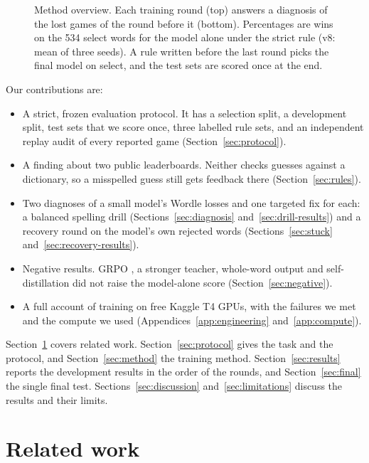 \documentclass{article}
\begin{document}
\begin{figure}[htbp]
\centering
\resizebox{\linewidth}{!}{}
\caption{Method overview. Each training round (top) answers a diagnosis of the lost games of the round before it (bottom). Percentages are wins on the 534 select words for the model alone under the strict rule (v8: mean of three seeds). A rule written before the last round picks the final model on select, and the test sets are scored once at the end.}
\label{fig:overview}
\end{figure}

Our contributions are:
\begin{itemize}
\item A strict, frozen evaluation protocol. It has a selection split, a development split, test sets that we score once, three labelled rule sets, and an independent replay audit of every reported game (Section~\ref{sec:protocol}).
\item A finding about two public leaderboards. Neither checks guesses against a dictionary, so a misspelled guess still gets feedback there (Section~\ref{sec:rules}).
\item Two diagnoses of a small model's Wordle losses and one targeted fix for each: a balanced spelling drill (Sections~\ref{sec:diagnosis} and~\ref{sec:drill-results}) and a recovery round on the model's own rejected words (Sections~\ref{sec:stuck} and~\ref{sec:recovery-results}).
\item Negative results. GRPO \citep{shao2024deepseekmath}, a stronger teacher, whole-word output and self-distillation did not raise the model-alone score (Section~\ref{sec:negative}).
\item A full account of training on free Kaggle T4 GPUs, with the failures we met and the compute we used (Appendices~\ref{app:engineering} and~\ref{app:compute}).
\end{itemize}

Section~\ref{sec:related} covers related work.
Section~\ref{sec:protocol} gives the task and the protocol, and Section~\ref{sec:method} the training method.
Section~\ref{sec:results} reports the development results in the order of the rounds, and Section~\ref{sec:final} the single final test.
Sections~\ref{sec:discussion} and~\ref{sec:limitations} discuss the results and their limits.

\section{Related work}
\label{sec:related}
\end{document}
